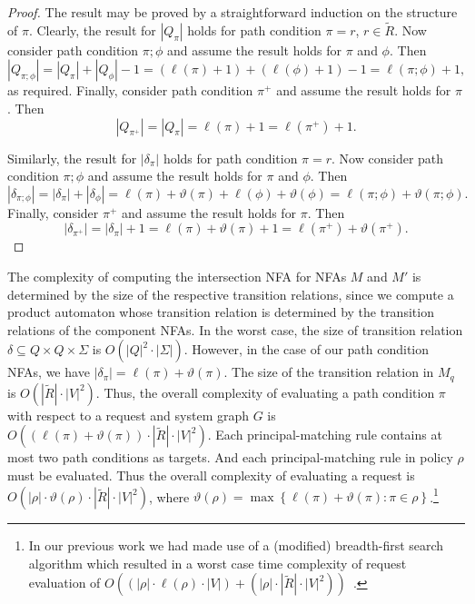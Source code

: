 \documentclass{article}
\newcommand{\set}[1]{\ensuremath{\left\{#1\right\}}} \newcommand{\setO}[1]{\ensuremath{\left\{#1\right.}} \newcommand{\setC}[1]{\ensuremath{\left.#1\right\}}} \newcommand{\setN}[1]{\ensuremath{\left.#1\right.}} \newcommand{\sett}[1]{\ensuremath{\left\{\textit{#1}\right\}}} \newcommand{\tuple}[1]{\ensuremath{\left(#1\right)}} \newcommand{\tuplet}[1]{\ensuremath{\left(\textit{#1}\right)}} \newcommand{\card}[1]{\left| #1 \right|}
\newcommand{\RcoR}{\ensuremath{\widetilde{R}}} \newcommand{\entity}[1]{\ensuremath{#1}} \newcommand{\rel}[1]{\ensuremath{#1}} \newcommand{\relw}[1]{\textsf{#1}} \newcommand{\comp}{\mathbin{;}} \newcommand{\relpc}[1]{\textsf{#1}} \newcommand{\princ}[1]{\textsf{#1}} \newcommand{\ppmc}{\ensuremath{\phi}} \newcommand{\npmc}{\ensuremath{\psi}} \newcommand{\pmp}{\ensuremath{\rho}} \newcommand{\act}[1]{\textsf{#1}} \newcommand{\crs}{\ensuremath{\chi}} \newcommand{\crso}[1]{\textsf{#1}} \newcommand{\defo}[1]{#1} \newcommand{\mpalg}{\textsf{MatchPrincipal}\xspace} \renewcommand{\algorithmiccomment}[1]{// #1} \newcommand{\audita}[1]{\ensuremath{#1^\oplus}}
\begin{document}
\begin{proof}
 The result may be proved by a straightforward induction on the structure of $\pi$.
 Clearly, the result for $\card{Q_\pi}$ holds for path condition $\pi = r$, $r \in \RcoR$.
 Now consider path condition $\pi \comp \phi$ and assume the result holds for $\pi$ and $\phi$.
 Then \[ \card{Q_{\pi \comp \phi}} = \card{Q_{\pi}} + \card{Q_{\phi}} - 1 = (\ell(\pi) + 1) + (\ell(\phi) + 1) - 1 = \ell(\pi \comp \phi) + 1, \] as required.
 Finally, consider path condition $\pi^+$ and assume the result holds for $\pi$.
 Then \[ \card{Q_{\pi^+}} = \card{Q_{\pi}} = \ell(\pi) + 1 = \ell(\pi^+) + 1. \]

 Similarly, the result for $\card{\delta_\pi}$ holds for path condition $\pi = r$.
 Now consider path condition $\pi \comp \phi$ and assume the result holds for $\pi$ and $\phi$.
 Then
 \[
  \card{\delta_{\pi \comp \phi}} = \card{\delta_\pi} + \card{\delta_{\phi}} = \ell(\pi) + \vartheta(\pi) + \ell(\phi) + \vartheta(\phi) = \ell(\pi \comp \phi) + \vartheta(\pi \comp \phi).
 \]
 Finally, consider $\pi^+$ and assume the result holds for $\pi$.
 Then \[ \card{\delta_{\pi^+}} = \card{\delta_\pi} + 1 = \ell(\pi) + \vartheta(\pi) + 1 = \ell(\pi^+) + \vartheta(\pi^+). \]
\end{proof}

The complexity of computing the intersection NFA for NFAs $M$ and $M'$ is determined by the size of the respective transition relations, since we compute a product automaton whose transition relation is determined by the transition relations of the component NFAs.
In the worst case, the size of transition relation $\delta \subseteq Q \times Q \times \Sigma$ is $O(\card{Q}^2 \cdot \card{\Sigma})$.
However, in the case of our path condition NFAs, we have $\card{\delta_\pi} = \ell(\pi) + \vartheta(\pi)$.
The size of the transition relation in $M_q$ is $O(|\RcoR| \cdot \card{V}^2)$.
Thus, the overall complexity of evaluating a path condition $\pi$ with respect to a request and system graph $G$ is $O((\ell(\pi) + \vartheta(\pi)) \cdot |\RcoR| \cdot \card{V}^2)$.
Each principal-matching rule contains at most two path conditions as targets.
And each principal-matching rule in policy $\rho$ must be evaluated.
Thus the overall complexity of evaluating a request is $O(\card{\rho} \cdot \vartheta(\rho) \cdot |\RcoR| \cdot \card{V}^2)$, where $\vartheta(\rho) = \max\set{\ell(\pi) + \vartheta(\pi) : \pi \in \rho}$.\footnote{In our previous work we had made use of a (modified) breadth-first search algorithm which resulted in a worst case time complexity of request evaluation of \mbox{$O((|\rho| \cdot \ell(\rho) \cdot |V|) + (|\rho| \cdot |\RcoR| \cdot |V|^2))$}~\cite{CramptonS14}.}
\end{document}
